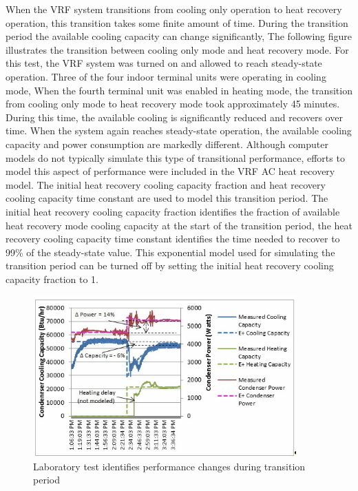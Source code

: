 When the VRF system transitions from cooling only operation to heat recovery operation, this transition takes some finite amount of time. During the transition period the available cooling capacity can change significantly, The following figure illustrates the transition between cooling only mode and heat recovery mode. For this test, the VRF system was turned on and allowed to reach steady-state operation. Three of the four indoor terminal units were operating in cooling mode, When the fourth terminal unit was enabled in heating mode, the transition from cooling only mode to heat recovery mode took approximately 45 minutes. During this time, the available cooling is significantly reduced and recovers over time. When the system again reaches steady-state operation, the available cooling capacity and power consumption are markedly different. Although computer models do not typically simulate this type of transitional performance, efforts to model this aspect of performance were included in the VRF AC heat recovery model. The initial heat recovery cooling capacity fraction and heat recovery cooling capacity time constant are used to model this transition period. The initial heat recovery cooling capacity fraction identifies the fraction of available heat recovery mode cooling capacity at the start of the transition period, the heat recovery cooling capacity time constant identifies the time needed to recover to 99\% of the steady-state value. This exponential model used for simulating the transition period can be turned off by setting the initial heat recovery cooling capacity fraction to 1.

\begin{figure}[hbtp] %
\centering
\includegraphics[width=0.9\textwidth, height=0.9\textheight, keepaspectratio=true]{media/image5367.png}
\caption{Laboratory test identifies performance changes during transition period \label{fig:laboratory-test-identifies-performance-changes-during-transition-period}}
\end{figure}

